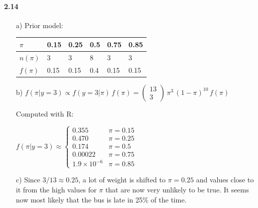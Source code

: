 \documentclass[fontsize=11pt,DIV=18,parskip=half]{scrartcl}
\begin{document}
\paragraph{2.14}
\begin{enumerate}
\item[a)] Prior model:

\begin{tabular}{llllll}
\hline
$\pi$ & 0.15 & 0.25 & 0.5 & 0.75 & 0.85 \\
\hline
$n(\pi)$ & 3 & 3 & 8 & 3 & 3 \\
\hline
$f(\pi)$ & 0.15 & 0.15 & 0.4 & 0.15 & 0.15 \\
\hline
\end{tabular}

\item[b)] $f(\pi|y=3) \propto f(y=3|\pi)\, f(\pi) = \begin{pmatrix} 13 \\ 3 \end{pmatrix} \, \pi^{3} \, (1-\pi)^{10} \, f(\pi)$

Computed with R:

$f(\pi|y=3) \approx \left\{ \begin{array}{ll}0.355 & \pi=0.15\\0.470 & \pi=0.25\\ 0.174 & \pi=0.5\\ 0.00022 & \pi=0.75 \\ 1.9\times10^{-6} & \pi=0.85\end{array}\right.$ 

\item[c)] Since $3/13 \approx 0.25$, a lot of weight is shifted to $\pi=0.25$ and values close to it from the high values for $\pi$ that are now very unlikely to be true. It seems now most likely that the bus is late in 25\% of the time.
\end{enumerate}
\end{document}
